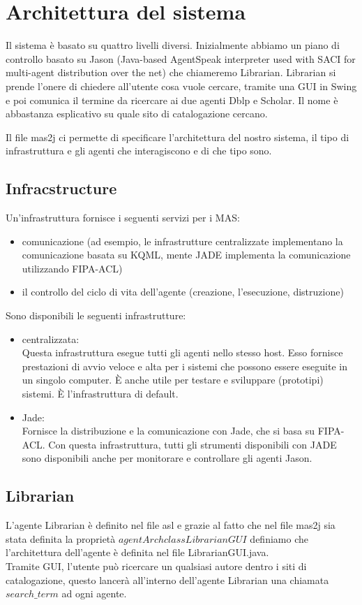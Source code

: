 \documentclass[12pt]{article}
\begin{document}
\section{Architettura del sistema}
Il sistema \`e basato su quattro livelli diversi. Inizialmente abbiamo un piano di controllo basato su Jason (Java-based AgentSpeak interpreter used with SACI for multi-agent distribution over the net) che chiameremo Librarian. Librarian si prende l'onere di chiedere all'utente cosa vuole cercare, tramite una GUI in Swing e poi comunica il termine da ricercare ai due agenti Dblp e Scholar. Il nome \`e abbastanza esplicativo su quale sito di catalogazione cercano.
 
Il file mas2j ci permette di specificare l'architettura del nostro sistema, il tipo di infrastruttura e gli agenti che interagiscono e di che tipo sono.
\\
\subsection{Infracstructure}
Un'infrastruttura fornisce i seguenti servizi per i MAS:
\begin{itemize}
\item comunicazione (ad esempio, le infrastrutture centralizzate implementano la comunicazione basata su KQML, mente JADE implementa la comunicazione utilizzando FIPA-ACL)
\item il controllo del ciclo di vita dell'agente (creazione, l'esecuzione, distruzione)
\end{itemize}
Sono disponibili le seguenti infrastrutture:
\begin{itemize}
\item  centralizzata: \\ Questa infrastruttura esegue tutti gli agenti nello stesso host. Esso fornisce prestazioni di avvio veloce e alta per i sistemi che possono essere eseguite in un singolo computer. \`E  anche utile per testare e sviluppare (prototipi) sistemi. \`E l'infrastruttura di default.
\item Jade: \\ Fornisce la distribuzione e la comunicazione con Jade, che si basa su FIPA-ACL. Con questa infrastruttura, tutti gli strumenti disponibili con JADE sono disponibili anche per monitorare e controllare gli agenti Jason.
\end{itemize}
\subsection{Librarian}

\newpage

L'agente Librarian \`e definito nel file asl e grazie al fatto che nel file mas2j sia stata definita la propriet\`a $agentArchclass LibrarianGUI$ definiamo che l'architettura dell'agente \`e definita nel file LibrarianGUI.java. \\
Tramite GUI, l'utente pu\`o ricercare un qualsiasi autore dentro i siti di catalogazione, questo lancer\`a all'interno dell'agente Librarian una chiamata $search\_term$ ad ogni agente. \\
\end{document}
